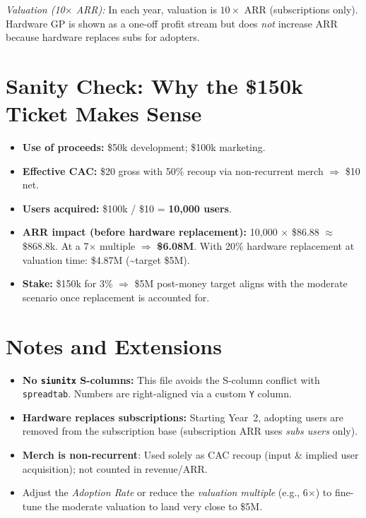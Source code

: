 \documentclass[11pt]{article}
\begin{document}
\noindent\textit{Valuation (10$\times$ ARR):} In each year, valuation is $10 \times$ ARR (subscriptions only). Hardware GP is shown as a one-off profit stream but does \emph{not} increase ARR because hardware replaces subs for adopters.

\section*{Sanity Check: Why the \$150k Ticket Makes Sense}
\begin{itemize}
  \item \textbf{Use of proceeds:} \$50k development; \$100k marketing.
  \item \textbf{Effective CAC:} \$20 gross with 50\% recoup via non-recurrent merch $\Rightarrow$ \$10 net.
  \item \textbf{Users acquired:} \$100k / \$10 = \textbf{10{,}000 users}.
  \item \textbf{ARR impact (before hardware replacement):} 10{,}000 $\times$ \$86.88 $\approx$ \$868.8k. At a 7$\times$ multiple $\Rightarrow$ \textbf{\$6.08M}. With 20\% hardware replacement at valuation time: \$4.87M (\textasciitilde target \$5M).
  \item \textbf{Stake:} \$150k for 3\% $\Rightarrow$ \$5M post-money target aligns with the moderate scenario once replacement is accounted for.
\end{itemize}

\section*{Notes and Extensions}
\begin{itemize}
  \item \textbf{No \texttt{siunitx} S-columns:} This file avoids the S-column conflict with \texttt{spreadtab}. Numbers are right-aligned via a custom \texttt{Y} column.
  \item \textbf{Hardware replaces subscriptions:} Starting Year~2, adopting users are removed from the subscription base (subscription ARR uses \emph{subs users} only).
  \item \textbf{Merch is non-recurrent}: Used solely as CAC recoup (input \& implied user acquisition); not counted in revenue/ARR.
  \item Adjust the \emph{Adoption Rate} or reduce the \emph{valuation multiple} (e.g., 6$\times$) to fine-tune the moderate valuation to land very close to \$5M.
\end{itemize}
\end{document}
